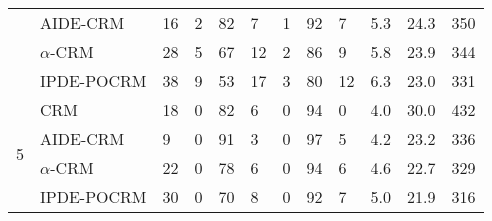 \begin{tabular*}{\textwidth}{@{\extracolsep\fill}clllllllllll@{\extracolsep\fill}}
 & AIDE-CRM & 16 & 2 & 82 & 7 & 1 & 92 & 7 & 5.3 & 24.3 & 350\\
 & $\alpha$-CRM & 28 & 5 & 67 & 12 & 2 & 86 & 9 & 5.8 & 23.9 & 344\\
 & IPDE-POCRM & 38 & 9 & 53 & 17 & 3 & 80 & 12 & 6.3 & 23.0 & 331\\
\midrule
\multirow{4}{2em}{5} & CRM & 18 & 0 & 82 & 6 & 0 & 94 & 0 & 4.0 & 30.0 & 432\\
 & AIDE-CRM & 9 & 0 & 91 & 3 & 0 & 97 & 5 & 4.2 & 23.2 & 336\\
 & $\alpha$-CRM & 22 & 0 & 78 & 6 & 0 & 94 & 6 & 4.6 & 22.7 & 329\\
 & IPDE-POCRM & 30 & 0 & 70 & 8 & 0 & 92 & 7 & 5.0 & 21.9 & 316\\
\bottomrule
\end{tabular*}

